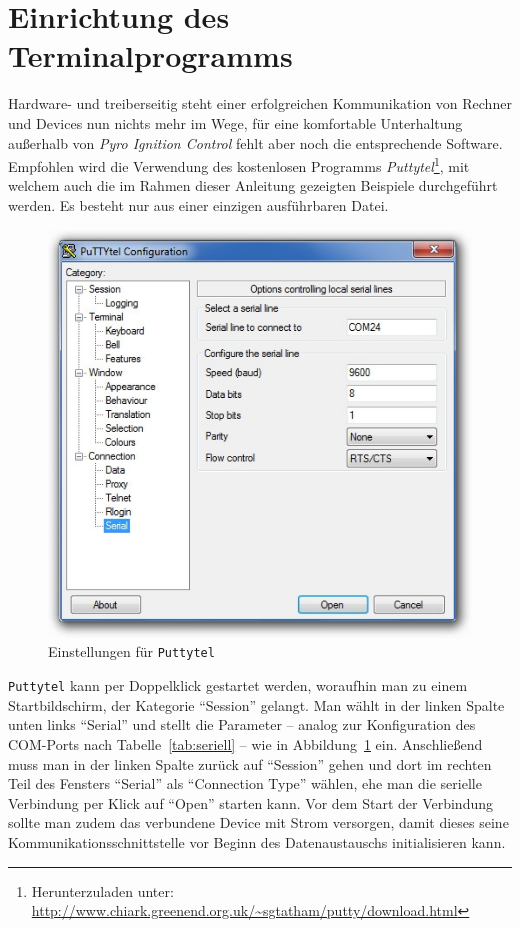 \documentclass[pdftex, parskip, numbers=noenddot, toc=listof]{scrbook}
\newcommand{\pic}{\emph{Pyro Ignition Control}}
\begin{document}
	\section{Einrichtung des Terminalprogramms}

	Hardware- und treiberseitig steht einer erfolgreichen Kommunikation von Rechner und Devices nun nichts mehr im Wege, für eine komfortable Unterhaltung außerhalb von {\pic} fehlt aber noch die entsprechende Software. Empfohlen wird die Verwendung des kostenlosen Programms \emph{Puttytel}\footnote{Herunterzuladen unter: \url{http://www.chiark.greenend.org.uk/~sgtatham/putty/download.html}}, mit welchem auch die im Rahmen dieser Anleitung gezeigten Beispiele durchgeführt werden. Es besteht nur aus einer einzigen ausführbaren Datei.

	\begin{figure}
		\centering
		\includegraphics[width=.75\textwidth]{Bilder/puttytelstart}
		\caption{Einstellungen für \texttt{Puttytel}}
		\label{fig:puttytelstart}
	\end{figure}

	\texttt{Puttytel} kann per Doppelklick gestartet werden, woraufhin man zu einem Startbildschirm, der Kategorie \enquote{Session} gelangt. Man wählt in der linken Spalte unten links \enquote{Serial} und stellt die Parameter -- analog zur Konfiguration des COM-Ports nach Tabelle~\ref{tab:seriell} -- wie in Abbildung~\ref{fig:puttytelstart} ein. Anschließend muss man in der linken Spalte zurück auf \enquote{Session} gehen und dort im rechten Teil des Fensters \enquote{Serial} als \enquote{Connection Type} wählen, ehe man die serielle Verbindung per Klick auf \enquote{Open} starten kann. Vor dem Start der Verbindung sollte man zudem das verbundene Device mit Strom versorgen, damit dieses seine Kommunikationsschnittstelle vor Beginn des Datenaustauschs initialisieren kann.
\end{document}
